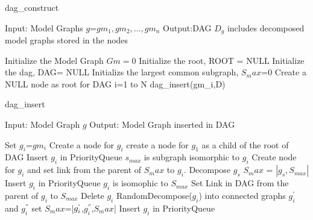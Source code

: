 \documentclass[prodmode,acmtecs]{acmsmall}
\begin{document}
\begin{algorithm}
\caption{dag_construct}
\label{alg:alg101}
\begin{algorithmic}
\STATE Input: Model Graphs $g$=${gm_1,gm_2,\dots,gm_n}$
\STATE Output:DAG  $D_g$ includes decomposed model graphs stored in the nodes
\end{algorithmic}
\begin{algorithmic}[1]
\STATE Initialize the Model Graph $Gm=0$
\STATE Initialize the root, ROOT = NULL
\STATE Initialize the dag, DAG= NULL 
\STATE Initializs the largest common subgraph, $S_max$=0  
\STATE Create a NULL node as root for DAG
\FOR i=1 to N
  dag_insert(gm_i,D)
\ENDFOR

\begin{algorithm}
\caption{dag_insert}
\label{alg:alg102}
\begin{algorithmic}
\STATE Input: Model Graph $g$
\STATE Output: Model Graph inserted in DAG
\end{algorithmic}
\begin{algorithmic}[1]
  
    \STATE Set $g_i$=$gm_i$ 
    \STATE Create a node for $g_i$
    \ENDIF
        \STATE create a node for $g_1$ as a child of the root of DAG 
        \STATE Insert $g_i$ in PriorityQueue
    \ENDIF
    \ELSE
        \STATE $s_{max}$ is subgraph isomorphic to $g_i$ 
        \STATE Create node for $g_i$ and set link from the parent of $S_max$ to  $g_i$.
        \STATE Decompose $g_s$
        \STATE $S_max$ = $|g_s,S_{max}|$
        \STATE Insert $g_i$ in PriorityQueue  
    \ENDIF
    \RETURN
    \ELSE
        \STATE $g_i$ is isomophic to  $S_{max}$ 
        \STATE Set Link in DAG from the parent of $g_i$ to  $S_{max}$ 
        \STATE Delete $g_i$
    \ENDIF
    \RETURN
    \ELSE
        \STATE RandomDecompose($g_i$) into connected graphs $g_i^{'}$ and  $g_i^{''}$
        \STATE set $S_max$=|$g_i^`$,$g_i^{''}$,$S_max$|
        \STATE Insert $g_i$ in  PriorityQueue 
    \ENDIF
    \RETURN
\ENDWHILE
\end{algorithmic}
\end{algorithm}


\end{algorithmic}
\end{algorithm}
\end{document}
